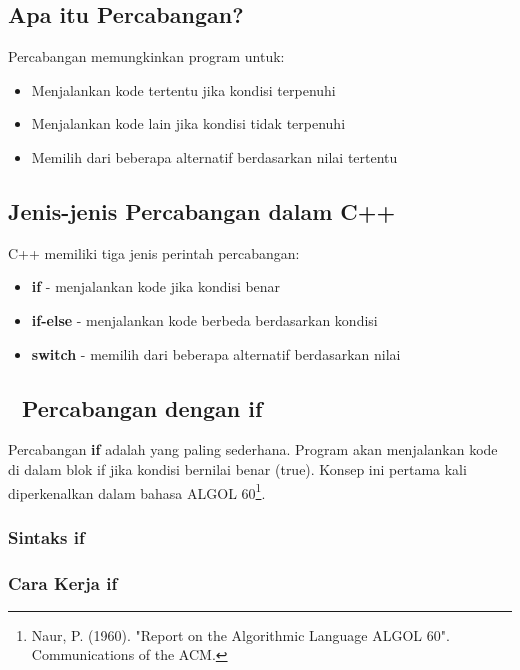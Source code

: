 \subsection{Apa itu Percabangan?}

Percabangan memungkinkan program untuk:
\begin{itemize}
\item Menjalankan kode tertentu jika kondisi terpenuhi
\item Menjalankan kode lain jika kondisi tidak terpenuhi
\item Memilih dari beberapa alternatif berdasarkan nilai tertentu
\end{itemize}

\subsection{Jenis-jenis Percabangan dalam C++}

C++ memiliki tiga jenis perintah percabangan:
\begin{itemize}
\item \textbf{if} - menjalankan kode jika kondisi benar
\item \textbf{if-else} - menjalankan kode berbeda berdasarkan kondisi
\item \textbf{switch} - memilih dari beberapa alternatif berdasarkan nilai
\end{itemize}

\subsection{🔀 Percabangan dengan if}\label{percabangan-dengan-if}

Percabangan \textbf{if} adalah yang paling sederhana. Program akan menjalankan kode di dalam blok if jika kondisi bernilai benar (true). Konsep ini pertama kali diperkenalkan dalam bahasa ALGOL 60\footnote{Naur, P. (1960). "Report on the Algorithmic Language ALGOL 60". Communications of the ACM.}.

\subsubsection{Sintaks if}



\subsubsection{Cara Kerja if}

